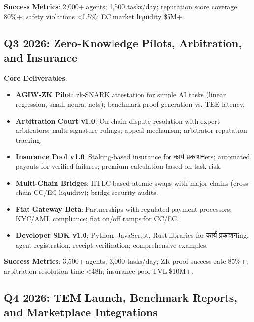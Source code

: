 \documentclass[11pt]{article}
\begin{document}
\begin{itemize}[noitemsep]
\begin{itemize}[noitemsep]
\begin{itemize}[noitemsep]
\begin{itemize}[noitemsep]
\begin{itemize}[noitemsep]
\begin{itemize}[noitemsep]
\textbf{Success Metrics}: 2,000+ agents; 1,500 tasks/day; reputation score coverage 80\%+; safety violations <0.5\%; EC market liquidity \$5M+.

\subsection{Q3 2026: Zero-Knowledge Pilots, Arbitration, and Insurance}

\textbf{Core Deliverables}:
\begin{itemize}[noitemsep]
  \item \textbf{AGIW-ZK Pilot}: zk-SNARK attestation for simple AI tasks (linear regression, small neural nets); benchmark proof generation vs. TEE latency.
  \item \textbf{Arbitration Court v1.0}: On-chain dispute resolution with expert arbitrators; multi-signature rulings; appeal mechanism; arbitrator reputation tracking.
  \item \textbf{Insurance Pool v1.0}: Staking-based insurance for कार्य प्रकाशनers; automated payouts for verified failures; premium calculation based on task risk.
  \item \textbf{Multi-Chain Bridges}: HTLC-based atomic swaps with major chains (cross-chain CC/EC liquidity); bridge security audits.
  \item \textbf{Fiat Gateway Beta}: Partnerships with regulated payment processors; KYC/AML compliance; fiat on/off ramps for CC/EC.
  \item \textbf{Developer SDK v1.0}: Python, JavaScript, Rust libraries for कार्य प्रकाशनing, agent registration, receipt verification; comprehensive examples.
\end{itemize}

\textbf{Success Metrics}: 3,500+ agents; 3,000 tasks/day; ZK proof success rate 85\%+; arbitration resolution time <48h; insurance pool TVL \$10M+.

\subsection{Q4 2026: TEM Launch, Benchmark Reports, and Marketplace Integrations}


\end{itemize}
\end{itemize}
\end{itemize}
\end{itemize}
\end{itemize}
\end{itemize}
\end{document}
